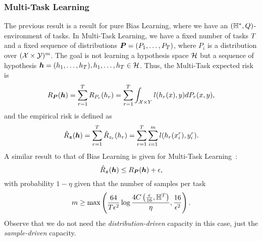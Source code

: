 \subsubsection*{Multi-Task Learning}
The previous result is a result for pure Bias Learning, where we have an $(\mathbb{H}^{*}, Q)$-environment of tasks. In Multi-Task Learning, we have a fixed number of tasks $T$ and a fixed sequence of distributions $\bm{P} = (P_1, \ldots, P_T)$, where $P_i$ is a distribution over $(\mathcal{X} \times \mathcal{Y})^m$. The goal is not learning a hypothesis space $\mathcal{H}$ but a sequence of hypothesis $\bm{h} = (h_1, \ldots, h_T), h_1, \ldots, h_T \in \mathcal{H} $. Thus, the Multi-Task expected risk is
\begin{equation}\label{eq:mtlearn_exprisk}
    \risk_{\bprobseq}(\myvec{\hypf}) = \sum_{r=1}^\ntasks \risk_{P_r}(\hypf_r)  = \sum_{r=1}^\ntasks \int_{\Xspace \times Y} l(\hypf_r(x), y) d{P_r}(x, y),
\end{equation}
and the empirical risk is defined as
\begin{equation}\label{eq:mtlearn_emprisk}
    \bemprisk(\myvec{\hypf}) = \sum_{r=1}^\ntasks \hat{\risk}_{\sample_r}(\hypf_r) = \sum_{r=1}^\ntasks \sum_{i=1}^m l(\hypf_r(x_i^r), y_i^r).
\end{equation}
A similar result to that of Bias Learning is given for Multi-Task Learning~\cite[Theorem~4]{baxter2000model}:
\begin{equation}
    \nonumber
    \hat{R}_{\bm{z}}(\bm{h}) \leq R_{\bm{P}}(\bm{h}) + \epsilon,
\end{equation}
with probability $1 - \eta$ given that the number of samples per task
\begin{equation}
    \nonumber
    m \geq \max \left( \frac{64}{T \epsilon^2} \log\frac{4C\left(\frac{\epsilon}{16}, \mathbb{H}^{T}\right)}{\eta} , \frac{16}{\epsilon^2}\right).
\end{equation}
Observe that we do not need the \emph{distribution-driven} capacity in this case, just the \emph{sample-driven} capacity.
